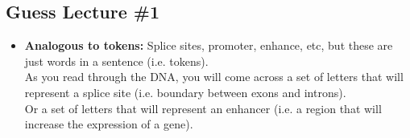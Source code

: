 \subsection{Guess Lecture \#1}
\begin{summary}
    \begin{itemize}
        \item \textbf{Analogous to tokens:} Splice sites, promoter, enhance, etc, but these are just words in a sentence (i.e. tokens). \\
        As you read through the DNA, you will come across a set of letters that will represent a splice site (i.e. boundary between exons and introns). \\
        Or a set of letters that will represent an enhancer (i.e. a region that will increase the expression of a gene). \\
    \end{itemize}
\end{summary}